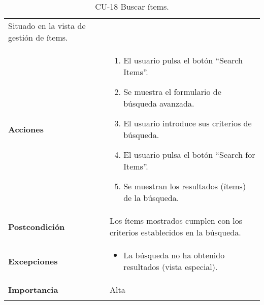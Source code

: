 \begin{longtable}[]{@{}ll@{}}
\begin{minipage}[t]{0.69\columnwidth}
Situado en la vista de gestión de ítems.\strut
\end{minipage}\tabularnewline
\begin{minipage}[t]{0.25\columnwidth}\raggedright
\textbf{Acciones}\strut
\end{minipage} & \begin{minipage}[t]{0.69\columnwidth}\raggedright
\begin{enumerate}
\def\labelenumi{\arabic{enumi}.}
\tightlist
\item
  El usuario pulsa el botón ``Search Items''.
\item
  Se muestra el formulario de búsqueda avanzada.
\item
  El usuario introduce sus criterios de búsqueda.
\item
  El usuario pulsa el botón ``Search for Items''.
\item
  Se muestran los resultados (ítems) de la búsqueda.
\end{enumerate}\strut
\end{minipage}\tabularnewline
\begin{minipage}[t]{0.25\columnwidth}\raggedright
\textbf{Postcondición}\strut
\end{minipage} & \begin{minipage}[t]{0.69\columnwidth}\raggedright
Los ítems mostrados cumplen con los criterios establecidos en la
búsqueda.\strut
\end{minipage}\tabularnewline
\begin{minipage}[t]{0.25\columnwidth}\raggedright
\textbf{Excepciones}\strut
\end{minipage} & \begin{minipage}[t]{0.69\columnwidth}\raggedright
\begin{itemize}
\tightlist
\item
  La búsqueda no ha obtenido resultados (vista especial).
\end{itemize}\strut
\end{minipage}\tabularnewline
\begin{minipage}[t]{0.25\columnwidth}\raggedright
\textbf{Importancia}\strut
\end{minipage} & \begin{minipage}[t]{0.69\columnwidth}\raggedright
Alta\strut
\end{minipage}\tabularnewline
\bottomrule
\caption{CU-18 Buscar ítems.}
\end{longtable}

